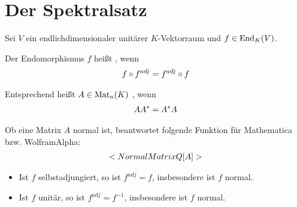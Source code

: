 \section{Der Spektralsatz}

Sei $V$ ein endlichdimensionaler unitärer $K$-Vektorraum und $f\in\End_K(V)$.

\begin{definition}
	Der Endomorphismus $f$ heißt , wenn
	\begin{align}
		f\circ f^{adj}=f^{adj}\circ f\notag
	\end{align}
	
	Entsprechend heißt $A\in\Mat_n(K)$ , wenn
	\begin{align}
		AA^*=A^*A\notag
	\end{align}
\end{definition}

\begin{mathematica}
	Ob eine Matrix $A$ normal ist, beantwortet folgende Funktion für Mathematica bzw. WolframAlpha:
	\begin{align}
		\texttt{NormalMatrixQ[A]}\notag
	\end{align}
\end{mathematica}

\begin{example}
	\begin{itemize}
		\item Ist $f$ selbstadjungiert, so ist $f^{adj}=f$, insbesondere ist $f$ normal.
		\item Ist $f$ unitär, so ist $f^{adj}=f^{-1}$, insbesondere ist $f$ normal.
	\end{itemize}
\end{example}

